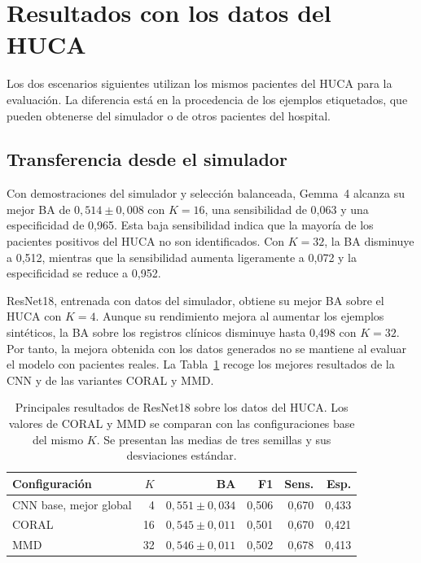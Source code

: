 \section{Resultados con los datos del HUCA}
\label{chap:comparacion_real}

Los dos escenarios siguientes utilizan los mismos pacientes del HUCA para la evaluación. La diferencia está en la procedencia de los ejemplos etiquetados, que pueden obtenerse del simulador o de otros pacientes del hospital.

\subsection{Transferencia desde el simulador}

Con demostraciones del simulador y selección balanceada, Gemma~4 alcanza su mejor BA de \(0,514 \pm 0,008\) con \(K=16\), una sensibilidad de 0,063 y una especificidad de 0,965. Esta baja sensibilidad indica que la mayoría de los pacientes positivos del HUCA no son identificados. Con \(K=32\), la BA disminuye a 0,512, mientras que la sensibilidad aumenta ligeramente a 0,072 y la especificidad se reduce a 0,952.

ResNet18, entrenada con datos del simulador, obtiene su mejor BA sobre el HUCA con \(K=4\). Aunque su rendimiento mejora al aumentar los ejemplos sintéticos, la BA sobre los registros clínicos disminuye hasta 0,498 con \(K=32\). Por tanto, la mejora obtenida con los datos generados no se mantiene al evaluar el modelo con pacientes reales. La Tabla~\ref{tab:domain_adaptation_summary} recoge los mejores resultados de la CNN y de las variantes CORAL y MMD.

\begin{table}[H]
  \centering
  \small
  \begin{tabularx}{0.95\textwidth}{Xrrrrr}
    \toprule
    Configuración & \(K\) & BA & F1 & Sens. & Esp. \\
    \midrule
    CNN base, mejor global & 4 & \(0,551 \pm 0,034\) & 0,506 & 0,670 & 0,433 \\
    CORAL & 16 & \(0,545 \pm 0,011\) & 0,501 & 0,670 & 0,421 \\
    MMD & 32 & \(0,546 \pm 0,011\) & 0,502 & 0,678 & 0,413 \\
    \bottomrule
  \end{tabularx}
  \caption{Principales resultados de ResNet18 sobre los datos del HUCA. Los valores de CORAL y MMD se comparan con las configuraciones base del mismo \(K\). Se presentan las medias de tres semillas y sus desviaciones estándar.}
  \label{tab:domain_adaptation_summary}
  \resultstablenote
\end{table}

